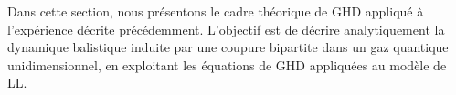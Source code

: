 Dans cette section, nous présentons le cadre théorique de \gls*{GHD} appliqué à l’expérience décrite précédemment. L’objectif est de décrire analytiquement la dynamique balistique induite par une coupure bipartite dans un gaz quantique unidimensionnel, en exploitant les équations de \gls*{GHD} appliquées au modèle de \gls*{LL}.\\





